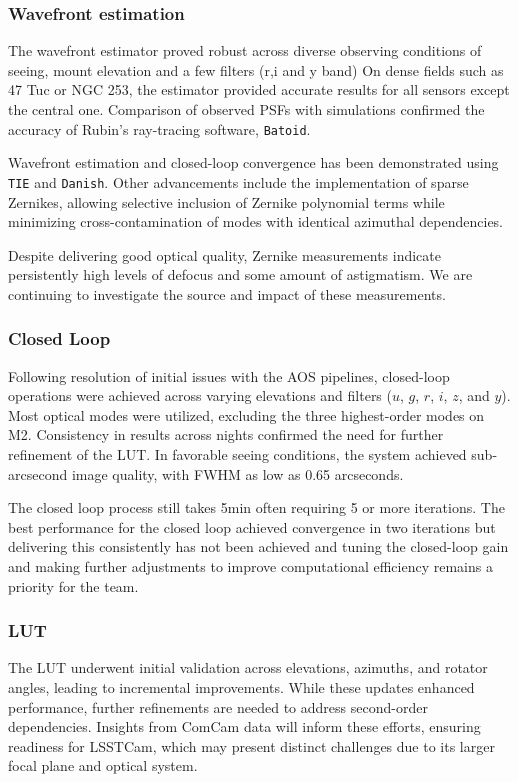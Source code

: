 \subsubsection{Wavefront estimation}
The wavefront estimator proved robust across diverse observing conditions of seeing, mount elevation and a few filters (r,i and y band) 
On dense fields such as 47 Tuc or NGC 253, the estimator provided accurate results for  all sensors except the central one.  Comparison of observed PSFs with simulations  confirmed the  accuracy of Rubin's ray-tracing software, \texttt{Batoid}.

Wavefront estimation and closed-loop convergence has been demonstrated using \texttt{TIE} and \texttt{Danish}. Other advancements include the implementation of sparse Zernikes,  allowing selective inclusion of Zernike polynomial terms while minimizing cross-contamination 
of modes with identical azimuthal dependencies.

Despite delivering good optical quality, Zernike measurements indicate persistently high levels of defocus and some amount of astigmatism. We are continuing to investigate the source and impact of these measurements.

\subsubsection{Closed Loop}
Following resolution of initial issues with the AOS pipelines,  closed-loop operations were achieved across varying elevations and filters ($u$, $g$, $r$, $i$, $z$, and $y$).  Most optical modes were utilized, excluding the three highest-order modes on M2.  Consistency in results across nights confirmed the need for further refinement of the LUT. In favorable seeing conditions, the system achieved sub-arcsecond image quality, with FWHM as low as 0.65 arcseconds.

The closed loop process still takes 5min  often requiring 5 or more iterations. The best performance for the closed loop achieved convergence in two iterations but delivering this consistently has not been achieved and tuning the closed-loop gain and making further adjustments to improve computational  efficiency remains a priority for the team.

\subsubsection{LUT}
The LUT underwent initial validation across elevations, azimuths, and rotator angles, 
leading to incremental improvements. While these updates enhanced performance, 
further refinements are needed to address second-order dependencies. Insights 
from ComCam data will inform these efforts, ensuring readiness for LSSTCam, which 
may present distinct challenges due to its larger focal plane and optical system.

